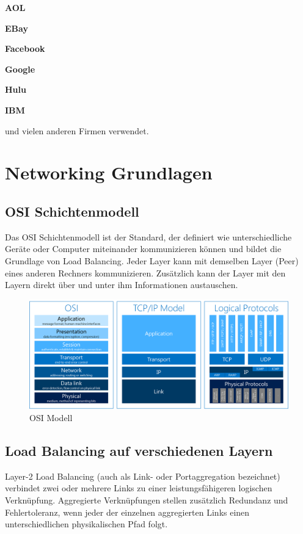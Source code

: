 \textbf{AOL}

\textbf{EBay}

\textbf{Facebook}

\textbf{Google}

\textbf{Hulu}

\textbf{IBM}

und vielen anderen Firmen verwendet.

\section{Networking Grundlagen}
\label{sec:Networking Grundlagen}

\subsection{OSI Schichtenmodell}
\label{sec:OSI Schichtenmodell}
Das OSI Schichtenmodell ist der Standard, der definiert wie unterschiedliche Geräte oder Computer miteinander kommunizieren können und bildet die Grundlage von Load Balancing. Jeder Layer kann mit demselben Layer (Peer) eines anderen Rechners kommunizieren. Zusätzlich kann der Layer mit den Layern direkt über und unter ihm Informationen austauschen. \cite{LoadBalancing2}

\begin{figure}[!h]
	\begin{center}
		\includegraphics[width=0.8\linewidth]{images/loadbalancing3.jpg}
		\caption{OSI Modell \cite{LoadBalancingGrafik2}}
		\label{OSI Modell}
	\end{center}
\end{figure}

\subsection{Load Balancing auf verschiedenen Layern}
\label{sec:Load Balancing auf verschiedenen Layern}
Layer-2 Load Balancing (auch als Link- oder Portaggregation bezeichnet) verbindet zwei oder mehrere Links zu einer leistungsfähigeren logischen Verknüpfung. Aggregierte Verknüpfungen stellen zusätzlich Redundanz und Fehlertoleranz, wenn jeder der einzelnen aggregierten Links einen unterschiedlichen physikalischen Pfad folgt.

